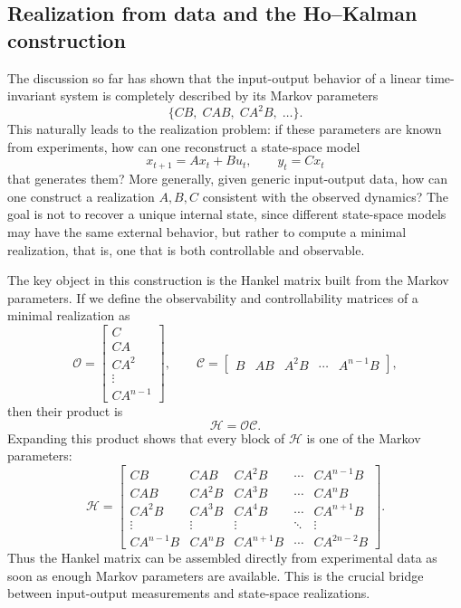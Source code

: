 \subsection{Realization from data and the Ho--Kalman construction}

The discussion so far has shown that the input-output behavior of a linear time-invariant system is completely described by its Markov parameters
\[
\{CB,\;CAB,\;CA^2B,\;\dots\}.
\]
This naturally leads to the realization problem: if these parameters are known from experiments, how can one reconstruct a state-space model
\[
x_{t+1}=Ax_t+Bu_t,\qquad y_t=Cx_t
\]
that generates them? More generally, given generic input-output data, how can one construct a realization \(A,B,C\) consistent with the observed dynamics? The goal is not to recover a unique internal state, since different state-space models may have the same external behavior, but rather to compute a minimal realization, that is, one that is both controllable and observable.

The key object in this construction is the Hankel matrix built from the Markov parameters. If we define the observability and controllability matrices of a minimal realization as
\[
\mathcal{O}=
\begin{bmatrix}
C\\
CA\\
CA^2\\
\vdots\\
CA^{n-1}
\end{bmatrix},
\qquad
\mathcal{C}=
\begin{bmatrix}
B & AB & A^2B & \cdots & A^{n-1}B
\end{bmatrix},
\]
then their product is
\[
\mathcal{H}=\mathcal{O}\mathcal{C}.
\]
Expanding this product shows that every block of \(\mathcal{H}\) is one of the Markov parameters:
\[
\mathcal{H}=
\begin{bmatrix}
CB & CAB & CA^2B & \cdots & CA^{n-1}B\\
CAB & CA^2B & CA^3B & \cdots & CA^nB\\
CA^2B & CA^3B & CA^4B & \cdots & CA^{n+1}B\\
\vdots & \vdots & \vdots & \ddots & \vdots\\
CA^{n-1}B & CA^nB & CA^{n+1}B & \cdots & CA^{2n-2}B
\end{bmatrix}.
\]
Thus the Hankel matrix can be assembled directly from experimental data as soon as enough Markov parameters are available. This is the crucial bridge between input-output measurements and state-space realizations.

